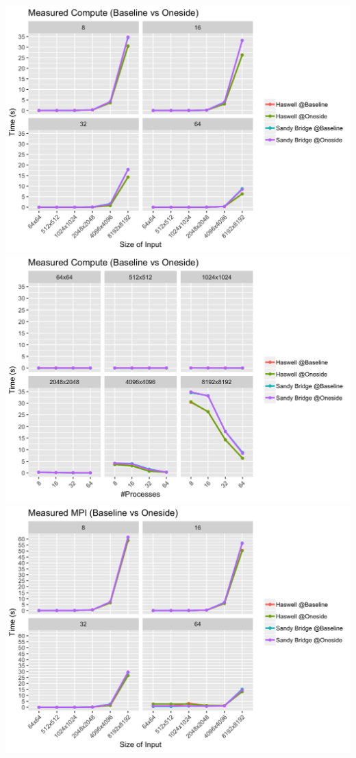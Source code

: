 \documentclass[10pt, letterpaper, twoside]{article}
\begin{document}
\begin{titlepage}
\begin{enumerate}
\includegraphics[scale = 0.18]{OSBaseline_Measured-Compute_Processes.png}
\includegraphics[scale = 0.18]{OSBaseline_Measured-Compute_InputSize.png}
\vspace{10mm}
\includegraphics[scale = 0.18]{OSBaseline_Measured-MPI_Processes.png}

\end{enumerate}
\end{titlepage}
\end{document}
